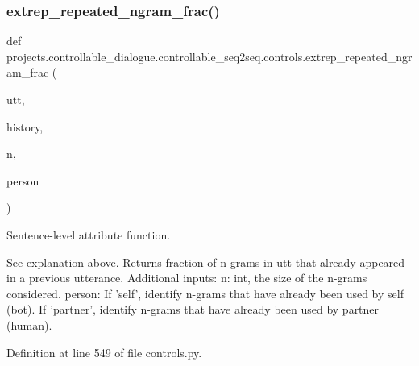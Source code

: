 \mbox{\label{namespaceprojects_1_1controllable__dialogue_1_1controllable__seq2seq_1_1controls_acf2eb363af8558f8f2e8afbacdc52c07}} 
\subsubsection{\texorpdfstring{extrep\+\_\+repeated\+\_\+ngram\+\_\+frac()}{extrep\_repeated\_ngram\_frac()}}
{\footnotesize\ttfamily def projects.\+controllable\+\_\+dialogue.\+controllable\+\_\+seq2seq.\+controls.\+extrep\+\_\+repeated\+\_\+ngram\+\_\+frac (\begin{DoxyParamCaption}\item[{}]{utt,  }\item[{}]{history,  }\item[{}]{n,  }\item[{}]{person }\end{DoxyParamCaption})}

\begin{DoxyVerb}Sentence-level attribute function.

See explanation above.
Returns fraction of n-grams in utt that already appeared in a previous utterance.
Additional inputs:
  n: int, the size of the n-grams considered.
  person: If 'self', identify n-grams that have already been used by self (bot).
    If 'partner', identify n-grams that have already been used by partner (human).
\end{DoxyVerb}
 

Definition at line 549 of file controls.\+py.


